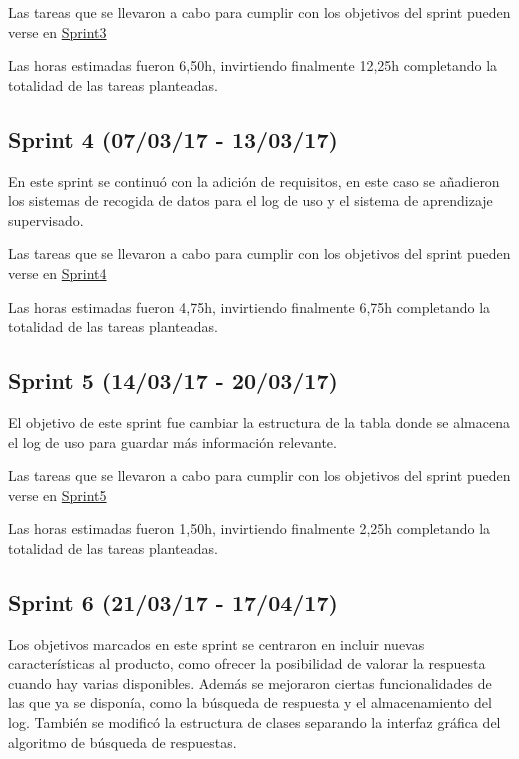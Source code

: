 Las tareas que se llevaron a cabo para cumplir con los objetivos del sprint pueden verse en \href{https://github.com/DanielSantidrian/UBUassistant/milestone/6?closed=1}{Sprint3}

Las horas estimadas fueron 6,50h, invirtiendo finalmente 12,25h completando la totalidad de las tareas planteadas.


\subsection{Sprint 4 (07/03/17 - 13/03/17)}

En este sprint se continuó con la adición de requisitos, en este caso se añadieron los sistemas de recogida de datos para el log de uso y el sistema de aprendizaje supervisado.

Las tareas que se llevaron a cabo para cumplir con los objetivos del sprint pueden verse en \href{https://github.com/DanielSantidrian/UBUassistant/milestone/7?closed=1}{Sprint4}

Las horas estimadas fueron 4,75h, invirtiendo finalmente 6,75h completando la totalidad de las tareas planteadas.


\subsection{Sprint 5 (14/03/17 - 20/03/17)}

El objetivo de este sprint fue cambiar la estructura de la tabla donde se almacena el log de uso para guardar más información relevante.

Las tareas que se llevaron a cabo para cumplir con los objetivos del sprint pueden verse en \href{https://github.com/DanielSantidrian/UBUassistant/milestone/8?closed=1}{Sprint5}

Las horas estimadas fueron 1,50h, invirtiendo finalmente 2,25h completando la totalidad de las tareas planteadas.


\subsection{Sprint 6 (21/03/17 - 17/04/17)}

Los objetivos marcados en este sprint se centraron en incluir nuevas características al producto, como ofrecer la posibilidad de valorar la respuesta cuando hay varias disponibles. Además se mejoraron ciertas funcionalidades de las que ya se disponía, como la búsqueda de respuesta y el almacenamiento del log. También se modificó la estructura de clases separando la interfaz gráfica del algoritmo de búsqueda de respuestas.

